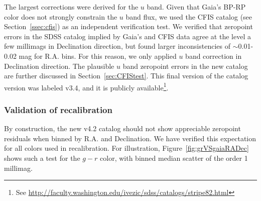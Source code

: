 \documentclass[fleqn,usenatbib]{mnras}
\begin{document}
The largest corrections were derived for the $u$ band. Given that Gaia's BP-RP
color does not strongly constrain the $u$ band flux, we used the CFIS catalog 
(see Section~\ref{ssec:cfis}) as an independent verification test. We verified that
zeropoint errors in the SDSS catalog implied by Gaia's and CFIS data agree at the
level a few millimags in Declination direction, but found larger inconsistencies of $\sim$0.01-0.02 mag
 for R.A. bins. For this reason, we only applied $u$ band 
correction in Declination direction. The plausible $u$ band zeropoint errors in 
the new catalog are further discussed in Section~\ref{sec:CFIStest}. This final version of the catalog version was
labeled v3.4, and it is publicly available\footnote{See \url{http://faculty.washington.edu/ivezic/sdss/catalogs/stripe82.html}}. 




\subsubsection{Validation of recalibration  \label{sec:SSCvsGaia}} 
  
By construction, the new v4.2 catalog should not show appreciable zeropoint residuals when 
binned by R.A. and Declination. We have verified this expectation for all colors used in 
recalibration. For illustration, Figure~\ref{fig:grVSgaiaRADec} shows such a test for the $g-r$ 
color, with binned median scatter of the order 1 millimag. 
\end{document}
